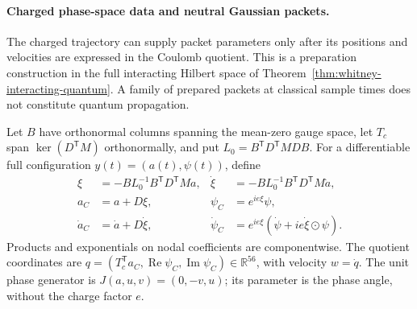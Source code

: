 \paragraph{Charged phase-space data and neutral Gaussian packets.}
The charged trajectory can supply packet parameters only after its
positions and velocities are expressed in the Coulomb quotient. This is a
preparation construction in the full interacting Hilbert space of
Theorem~\ref{thm:whitney-interacting-quantum}. A family of prepared packets
at classical sample times does not constitute quantum propagation.

Let \(B\) have orthonormal columns spanning the mean-zero gauge space,
let \(T_c\) span \(\ker(D^{\mathsf T}M)\) orthonormally, and put
\(L_0=B^{\mathsf T}D^{\mathsf T}MDB\). For a differentiable
full configuration \(y(t)=(a(t),\psi(t))\), define
\begin{align}
 \xi&=-BL_0^{-1}B^{\mathsf T}D^{\mathsf T}Ma,&
 \dot\xi&=-BL_0^{-1}B^{\mathsf T}D^{\mathsf T}M\dot a,\nonumber\\
 a_C&=a+D\xi,& \psi_C&=e^{ie\xi}\psi,\nonumber\\
 \dot a_C&=\dot a+D\dot\xi,&
 \dot\psi_C&=e^{ie\xi}(\dot\psi+ie\dot\xi\mathbin{\odot}\psi).
 \label{eq:whitney-packet-coulomb-tangent}
\end{align}
Products and exponentials on nodal coefficients are componentwise.
The quotient coordinates are
\(q=(T_c^{\mathsf T}a_C,\operatorname{Re}\psi_C,
\operatorname{Im}\psi_C)\in\mathbb R^{56}\), with velocity \(w=\dot q\). The unit phase generator is
\(J(a,u,v)=(0,-v,u)\); its parameter is the phase angle,
without the charge factor \(e\).

